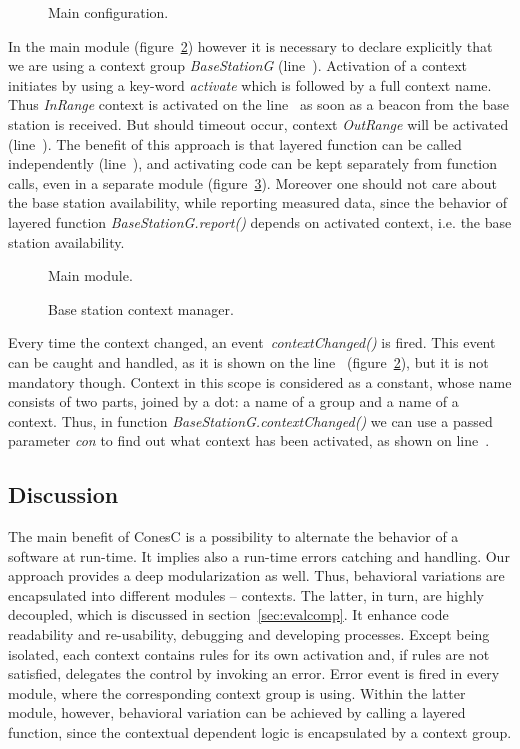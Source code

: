 
\begin{figure}[!h]
\TheSbox
\caption{Main configuration.}
\label{fig:mc}
\end{figure}

In the main module (figure~\ref{fig:mm}) however it is necessary to declare
explicitly that we are using a context group \emph{BaseStationG}
(line~). Activation of a context initiates by using a key-word
\emph{activate} which is followed by a full context name. Thus
\emph{InRange} context is activated on the line~ as soon as a
beacon from the base station is received. But should timeout occur, context
\emph{OutRange} will be activated (line~). The benefit of
this approach is that layered function can be called independently
(line~), and activating code can be kept separately from function
calls, even in a separate module (figure~\ref{fig:bscm}).
Moreover one should not care about the base station availability, while
reporting measured data, since the behavior of layered function
\emph{BaseStationG.report()} depends on activated context, i.e. the base
station availability.


\begin{figure}[!h]
\TheSbox
\caption{Main module.}
\label{fig:mm}
\end{figure}


\begin{figure}[!h]
\TheSbox
\caption{Base station context manager.}
\label{fig:bscm}
\end{figure}

Every time the context changed, an event~\emph{contextChanged()} is fired. This event can be
caught and handled, as it is shown on the line~ (figure~\ref{fig:mm}),
but it is not mandatory though. Context in this scope is considered as a constant,
whose name consists of two parts, joined by a dot: a name of a group and a name
of a context. Thus, in function \emph{BaseStationG.contextChanged()} we can use
a passed parameter \emph{con} to find out what context has been activated, as
shown on line~.

\subsection{Discussion}

The main benefit of ConesC is a possibility to alternate the behavior of a software at
run-time. It implies also a run-time errors catching and handling. Our approach
provides a deep modularization as well. Thus, behavioral variations are encapsulated
into different modules -- contexts. The latter, in turn, are highly decoupled, which
is discussed in section~\ref{sec:evalcomp}. It enhance code readability and re-usability, debugging
and developing processes. Except being isolated, each context contains rules for its
own activation and, if rules are not satisfied, delegates the control by invoking an error.
Error event is fired in every module, where the corresponding context group is using.
Within the latter module, however, behavioral variation can be achieved by calling a
layered function, since the contextual dependent logic is encapsulated by a context group.
